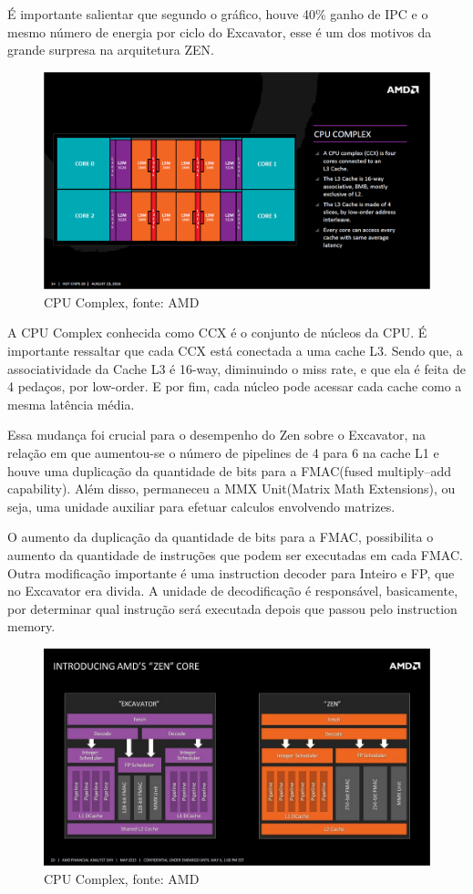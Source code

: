 \documentclass[12pt]{article}
\begin{document}
É importante salientar que segundo o gráfico, houve 40\% ganho de IPC e o mesmo número de energia por ciclo do Excavator, esse é um dos motivos da grande surpresa na arquitetura ZEN.


\begin{figure}[ht]
\centering
\includegraphics[width=120mm,scale=0.8]{AMD-Zen_CPU-Complex.png}
\caption{CPU Complex, fonte: AMD}
\label{fig:AMD CORE}
\end{figure}

A CPU Complex conhecida como CCX é o conjunto de núcleos da CPU. É importante ressaltar que cada CCX está conectada a uma cache L3. Sendo que, a associatividade da Cache L3 é 16-way, diminuindo o miss rate, e que ela é feita de 4 pedaços, por low-order. E por fim, cada núcleo pode acessar cada cache como a mesma latência média.

Essa mudança foi crucial para o desempenho do Zen sobre o Excavator, na relação em que aumentou-se o número de pipelines de 4 para 6 na cache L1 e houve uma duplicação da quantidade de bits para a FMAC(fused multiply–add capability). Além disso, permaneceu a MMX Unit(Matrix Math Extensions), ou seja, uma unidade auxiliar para efetuar calculos envolvendo matrizes. 

O aumento da duplicação da quantidade de bits para a FMAC, possibilita o aumento da quantidade de instruções que podem ser executadas em cada FMAC. Outra modificação importante é uma instruction decoder para Inteiro e FP, que no Excavator era divida. A unidade de decodificação é responsável, basicamente, por determinar qual instrução será executada depois que passou pelo instruction memory.


\begin{figure}[ht]
\centering
\includegraphics[width=115mm,scale=0.8]{zenex.jpg}
\caption{CPU Complex, fonte: AMD}
\label{fig:AMD CORE}
\end{figure}
\end{document}
